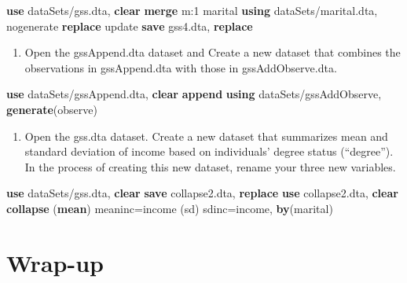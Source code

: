 \documentclass[
]{book}
\newenvironment{Shaded}{\begin{snugshade}}{\end{snugshade}}
\newcommand{\FunctionTok}[1]{\textcolor[rgb]{0.00,0.00,0.00}{#1}}
\newcommand{\KeywordTok}[1]{\textcolor[rgb]{0.13,0.29,0.53}{\textbf{#1}}}
\newcommand{\NormalTok}[1]{#1}
\providecommand{\tightlist}{%
  \setlength{\itemsep}{0pt}\setlength{\parskip}{0pt}}
\begin{document}
\begin{Shaded}
\begin{Highlighting}[]
  \KeywordTok{use}\NormalTok{ dataSets/gss.dta, }\KeywordTok{clear}
  \KeywordTok{merge} \FunctionTok{m}\NormalTok{:1 marital }\KeywordTok{using}\NormalTok{ dataSets/marital.dta, nogenerate }\KeywordTok{replace}\NormalTok{ update}
  \KeywordTok{save}\NormalTok{ gss4.dta, }\KeywordTok{replace}
\end{Highlighting}
\end{Shaded}

\begin{enumerate}
\def\labelenumi{\arabic{enumi}.}
\setcounter{enumi}{2}
\tightlist
\item
  Open the gssAppend.dta dataset and Create a new dataset that combines the observations in gssAppend.dta with those in gssAddObserve.dta.
\end{enumerate}

\begin{Shaded}
\begin{Highlighting}[]
  \KeywordTok{use}\NormalTok{ dataSets/gssAppend.dta, }\KeywordTok{clear}
  \KeywordTok{append} \KeywordTok{using}\NormalTok{ dataSets/gssAddObserve, }\KeywordTok{generate}\NormalTok{(observe) }
\end{Highlighting}
\end{Shaded}

\begin{enumerate}
\def\labelenumi{\arabic{enumi}.}
\setcounter{enumi}{3}
\tightlist
\item
  Open the gss.dta dataset. Create a new dataset that summarizes mean and standard deviation of income based on individuals' degree status (``degree''). In the process of creating this new dataset, rename your three new variables.
\end{enumerate}

\begin{Shaded}
\begin{Highlighting}[]
  \KeywordTok{use}\NormalTok{ dataSets/gss.dta, }\KeywordTok{clear}
  \KeywordTok{save}\NormalTok{ collapse2.dta, }\KeywordTok{replace}
  \KeywordTok{use}\NormalTok{ collapse2.dta, }\KeywordTok{clear}
  \KeywordTok{collapse}\NormalTok{ (}\KeywordTok{mean}\NormalTok{) meaninc=income (}\FunctionTok{sd}\NormalTok{) sdinc=income, }\KeywordTok{by}\NormalTok{(marital)}
\end{Highlighting}
\end{Shaded}

\hypertarget{wrap-up-8}{%
\section{Wrap-up}\label{wrap-up-8}}
\end{document}
